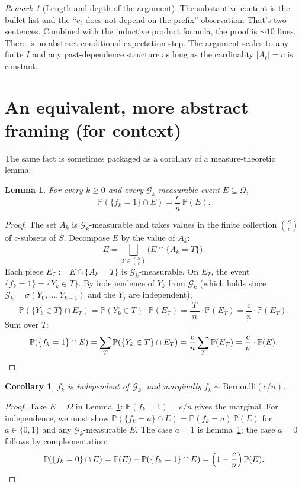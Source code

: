 \documentclass[11pt,a4paper]{article}
\newcommand{\Prob}{\mathbb{P}}
\newcommand{\G}{\mathcal{G}}
\theoremstyle{plain}
\newtheorem{lem}[thm]{Lemma}
\newtheorem{cor}[thm]{Corollary}
\theoremstyle{definition}
\theoremstyle{remark}
\newtheorem*{remark}{Remark}
\begin{document}
\begin{remark}[Length and depth of the argument]
The substantive content is the bullet list and the
``$c_\ell$ does not depend on the prefix'' observation. That's two
sentences. Combined with the inductive product formula, the proof is
$\sim 10$ lines. There is no abstract conditional-expectation step.
The argument scales to any finite $I$ and any past-dependence
structure as long as the cardinality $|A_\ell| = c$ is constant.
\end{remark}

\section{An equivalent, more abstract framing (for context)}

The same fact is sometimes packaged as a corollary of a
measure-theoretic lemma:

\begin{lem}\label{lem:cond-law}
For every $k \geq 0$ and every $\G_k$-measurable event
$E \subseteq \Omega$,
\[
  \Prob(\{f_k = 1\} \cap E) = \frac{c}{n}\, \Prob(E).
\]
\end{lem}

\begin{proof}
The set $A_k$ is $\G_k$-measurable and takes values in the finite
collection $\binom{S}{c}$ of $c$-subsets of $S$. Decompose $E$ by
the value of $A_k$:
\[
  E = \bigsqcup_{T \in \binom{S}{c}} \big(E \cap \{A_k = T\}\big).
\]
Each piece $E_T := E \cap \{A_k = T\}$ is $\G_k$-measurable. On $E_T$,
the event $\{f_k = 1\} = \{Y_k \in T\}$. By independence of $Y_k$ from
$\G_k$ (which holds since $\G_k = \sigma(Y_0, \dots, Y_{k-1})$ and the
$Y_j$ are independent),
\[
  \Prob(\{Y_k \in T\} \cap E_T)
    = \Prob(Y_k \in T) \cdot \Prob(E_T)
    = \frac{|T|}{n} \cdot \Prob(E_T)
    = \frac{c}{n} \cdot \Prob(E_T).
\]
Sum over $T$:
\[
  \Prob(\{f_k = 1\} \cap E)
    = \sum_T \Prob(\{Y_k \in T\} \cap E_T)
    = \frac{c}{n} \sum_T \Prob(E_T)
    = \frac{c}{n} \cdot \Prob(E). \qedhere
\]
\end{proof}

\begin{cor}\label{cor:f-indep}
$f_k$ is independent of $\G_k$, and marginally $f_k \sim
\mathrm{Bernoulli}(c/n)$.
\end{cor}

\begin{proof}
Take $E = \Omega$ in Lemma~\ref{lem:cond-law}: $\Prob(f_k = 1) = c/n$
gives the marginal. For independence, we must show
$\Prob(\{f_k = a\} \cap E) = \Prob(f_k = a)\,\Prob(E)$ for $a \in
\{0, 1\}$ and any $\G_k$-measurable $E$. The case $a = 1$ is
Lemma~\ref{lem:cond-law}; the case $a = 0$ follows by complementation:
\[
  \Prob(\{f_k = 0\} \cap E) = \Prob(E) - \Prob(\{f_k = 1\} \cap E)
    = \Big(1 - \frac{c}{n}\Big)\,\Prob(E). \qedhere
\]
\end{proof}
\end{document}
